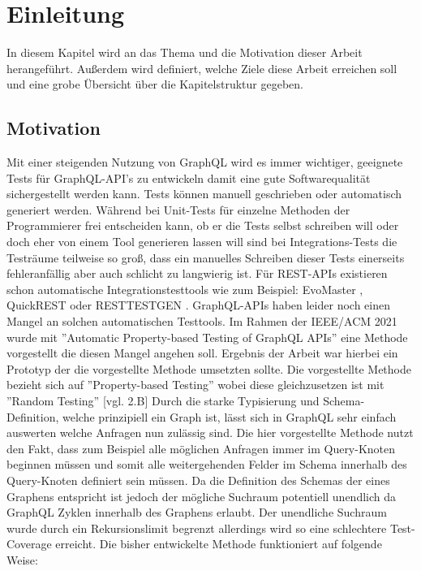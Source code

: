 \chapter{Einleitung}

In diesem Kapitel wird an das Thema und die Motivation dieser Arbeit herangeführt.
Außerdem wird definiert, welche Ziele diese Arbeit erreichen soll und eine grobe Übersicht über die
Kapitelstruktur gegeben.

\section{Motivation}

Mit einer steigenden Nutzung von GraphQL wird es immer wichtiger, geeignete Tests für GraphQL-API's zu entwickeln damit eine
gute Softwarequalität sichergestellt werden kann.
Tests können manuell geschrieben oder automatisch generiert werden.
Während bei Unit-Tests für einzelne Methoden der Programmierer frei entscheiden kann, ob er die Tests selbst schreiben will
oder doch eher von einem Tool generieren lassen will sind bei Integrations-Tests die Testräume teilweise so groß, dass ein
manuelles Schreiben dieser Tests einerseits fehleranfällig aber auch schlicht zu langwierig ist.
Für REST-APIs existieren schon automatische Integrationstesttools wie zum Beispiel: EvoMaster \cite{evo-master} , QuickREST \cite{karlsson2019quickrest} oder RESTTESTGEN \cite{rest-test-gen}.
GraphQL-APIs haben leider noch einen Mangel an solchen automatischen Testtools.
Im Rahmen der IEEE/ACM 2021 wurde mit ''Automatic Property-based Testing of GraphQL APIs''\cite{property-based-testing} eine Methode vorgestellt die diesen Mangel angehen soll.
Ergebnis der Arbeit war hierbei ein Prototyp der die vorgestellte Methode umsetzten sollte.
Die vorgestellte Methode bezieht sich auf ''Property-based Testing'' wobei diese gleichzusetzen ist mit ''Random Testing'' \cite{property-based-testing}[vgl. 2.B]
Durch die starke Typisierung und Schema-Definition, welche prinzipiell ein Graph ist, lässt sich in GraphQL
sehr einfach auswerten welche Anfragen nun zulässig sind.
Die hier vorgestellte Methode nutzt den Fakt, dass zum Beispiel alle möglichen Anfragen immer im Query-Knoten
beginnen müssen und somit alle weitergehenden Felder im Schema innerhalb des Query-Knoten definiert sein müssen.
Da die Definition des Schemas der eines Graphens entspricht ist jedoch der mögliche Suchraum potentiell unendlich da GraphQL
Zyklen innerhalb des Graphens erlaubt.
Der unendliche Suchraum wurde durch ein Rekursionslimit begrenzt allerdings wird so eine schlechtere Test-Coverage erreicht.
\newpage
Die bisher entwickelte Methode funktioniert auf folgende Weise:

